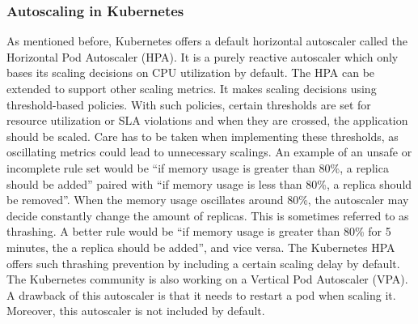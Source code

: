 \subsubsection{Autoscaling in Kubernetes}
As mentioned before, Kubernetes offers a default horizontal autoscaler called the Horizontal Pod Autoscaler (HPA)\citep{HPA}. It is a purely reactive autoscaler which only bases its scaling decisions on CPU utilization by default. The HPA can be extended to support other scaling metrics. It makes scaling decisions using threshold-based policies. With such policies, certain thresholds are set for resource utilization or SLA violations and when they are crossed, the application should be scaled. Care has to be taken when implementing these thresholds, as oscillating metrics could lead to unnecessary scalings. An example of an unsafe or incomplete rule set would be ``if memory usage is greater than 80\%, a replica should be added'' paired with ``if memory usage is less than 80\%, a replica should be removed''. When the memory usage oscillates around 80\%, the autoscaler may decide constantly change the amount of replicas. This is sometimes referred to as thrashing. A better rule would be ``if memory usage is greater than 80\% for 5 minutes, the a replica should be added'', and vice versa. The Kubernetes HPA offers such thrashing prevention by including a certain scaling delay by default.\\

The Kubernetes community is also working on a Vertical Pod Autoscaler (VPA)\citep{VPA}. A drawback of this autoscaler is that it needs to restart a pod when scaling it. Moreover, this autoscaler is not included by default.

